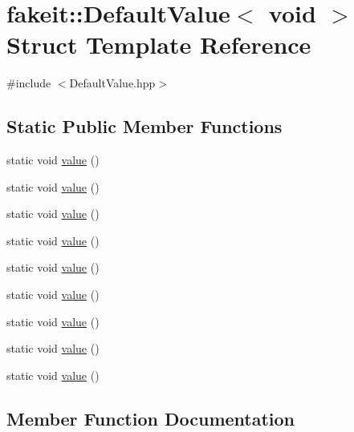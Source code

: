 \hypertarget{structfakeit_1_1DefaultValue_3_01void_01_4}{}\section{fakeit\+::Default\+Value$<$ void $>$ Struct Template Reference}
\label{structfakeit_1_1DefaultValue_3_01void_01_4}


{\ttfamily \#include $<$Default\+Value.\+hpp$>$}

\subsection*{Static Public Member Functions}
\begin{DoxyCompactItemize}
\item 
static void \mbox{\hyperlink{structfakeit_1_1DefaultValue_3_01void_01_4_ac3bd138eb3812474184bd9d3e84d0d01}{value}} ()
\item 
static void \mbox{\hyperlink{structfakeit_1_1DefaultValue_3_01void_01_4_ac3bd138eb3812474184bd9d3e84d0d01}{value}} ()
\item 
static void \mbox{\hyperlink{structfakeit_1_1DefaultValue_3_01void_01_4_ac3bd138eb3812474184bd9d3e84d0d01}{value}} ()
\item 
static void \mbox{\hyperlink{structfakeit_1_1DefaultValue_3_01void_01_4_ac3bd138eb3812474184bd9d3e84d0d01}{value}} ()
\item 
static void \mbox{\hyperlink{structfakeit_1_1DefaultValue_3_01void_01_4_ac3bd138eb3812474184bd9d3e84d0d01}{value}} ()
\item 
static void \mbox{\hyperlink{structfakeit_1_1DefaultValue_3_01void_01_4_ac3bd138eb3812474184bd9d3e84d0d01}{value}} ()
\item 
static void \mbox{\hyperlink{structfakeit_1_1DefaultValue_3_01void_01_4_ac3bd138eb3812474184bd9d3e84d0d01}{value}} ()
\item 
static void \mbox{\hyperlink{structfakeit_1_1DefaultValue_3_01void_01_4_ac3bd138eb3812474184bd9d3e84d0d01}{value}} ()
\item 
static void \mbox{\hyperlink{structfakeit_1_1DefaultValue_3_01void_01_4_ac3bd138eb3812474184bd9d3e84d0d01}{value}} ()
\end{DoxyCompactItemize}


\subsection{Member Function Documentation}
\mbox{\label{structfakeit_1_1DefaultValue_3_01void_01_4_ac3bd138eb3812474184bd9d3e84d0d01}} 
